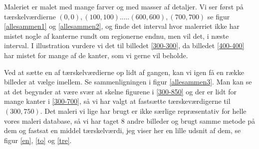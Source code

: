 Maleriet er malet med mange farver og med masser af detaljer. Vi ser
først på tærskelværdierne $(0,0),(100,100).....(600,600),(700,700)$ se
figur \ref{allesammen1} og \ref{allesammen2}, og finde det interval hvor
malerriet ikke har mistet nogle af kanterne rundt om regionerne endnu,
men vil det, i næste interval. I illustration vurdere vi det til
billedet \ref{300-300}, da billedet \ref{400-400} har mistet for mange
af de kanter, som vi gerne vil beholde.

Ved at sætte en af tærskelværdierne op lidt af gangen, kan vi igen få en
række billeder at vælge imellem. Se sammenligningen i figur
\ref{allesammen3}. Man kan se at det begynder at være svær at skelne
figurene i \ref{300-850} og der er lidt for mange kanter i
\ref{300-700}, så vi har valgt at fastsætte tærskeværdigerne til
$(300,750)$. Det maleri vi lige har brugt er ikke særlige repræsentativ
for helle vores maleri database, så vi har taget 8 andre billeder og
brugt samme metode på dem og fastsat en middel tærskelværdi, jeg viser
her en lille udsnit af dem, se figur \ref{en}, \ref{to} og \ref{tre}.

